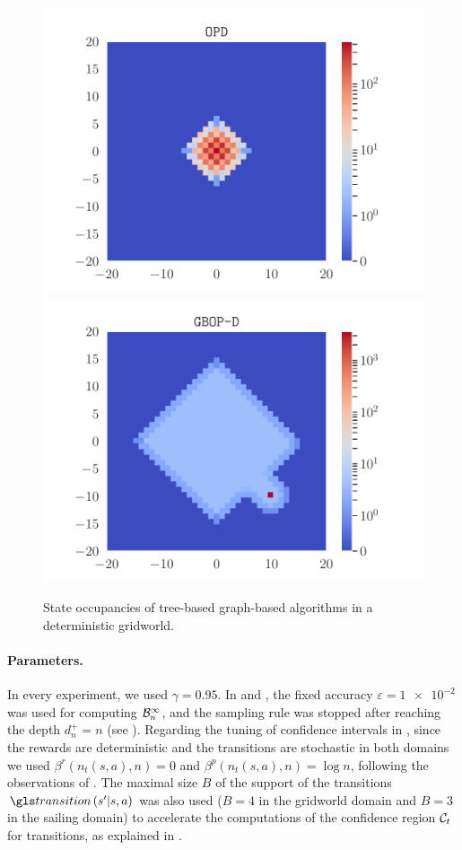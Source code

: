 \begin{figure}[ht]
	\centering
	\includegraphics[trim={1.8cm 0.4cm 1.8cm 0.7cm}, clip, width=0.45\linewidth]{img/gbop/occupations_OPD.pdf}
	\includegraphics[trim={1.8cm 0.4cm 1.8cm 0.7cm}, clip, width=0.45\linewidth]{img/gbop/occupations_GBOP-D.pdf}
	\caption{State occupancies of tree-based \vs graph-based algorithms in a deterministic gridworld.}
	\label{fig:deterministic-gridworld}
\end{figure}

\paragraph{Parameters.} In every experiment, we used $\gamma=0.95$. In \GBOPD and \GBOP, the fixed accuracy $\varepsilon=\num{1e-2}$ was used for computing $\mathcal{B}_n^\infty$, and the sampling rule was stopped after reaching the depth $d^+_n = n$ (see ).
Regarding the tuning of confidence intervals in \GBOP, since the rewards are deterministic and the transitions are stochastic in both domains we used $\beta^r(n_t(s,a), n) = 0$ and $\beta^p(n_t(s,a), n) = \log n$, following the observations of . The maximal size $B$ of the support of the transitions $\Ps\left(s'|s,a\right)$ was also used ($B=4$ in the gridworld domain and $B=3$ in the sailing domain) to accelerate the computations of the confidence region $\mathcal{C}_t$ for transitions, as explained in \citep{Jonsson2020planning}.

